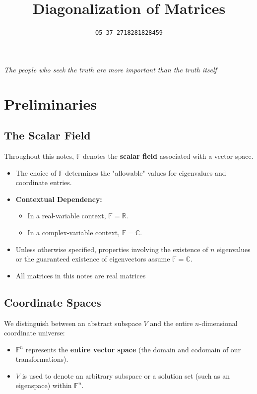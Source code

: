 \documentclass[11pt]{article}
\title{Diagonalization of Matrices}
\author{\texttt{O5-37-2718281828459}}
\begin{document}
    \maketitle

    \newpage
    \vspace*{\fill}
    \begin{center}
        \LARGE
        \selectfont\itshape The people who seek the truth are more important than the truth itself
    \end{center}
    \vspace*{\fill}

    \newpage
    \tableofcontents
    
    \newpage
    \setcounter{section}{-1}
    \section{Preliminaries}
    \subsection{The Scalar Field}
    Throughout this notes, $\mathbb{F}$ denotes the \textbf{scalar field} associated with a vector space. 
    \begin{itemize}
        \item The choice of $\mathbb{F}$ determines the "allowable" values for eigenvalues and coordinate entries.
        \item \textbf{Contextual Dependency:} 
        \begin{itemize}
            \item In a real-variable context, $\mathbb{F} = \mathbb{R}$.
            \item In a complex-variable context, $\mathbb{F} = \mathbb{C}$.
        \end{itemize}
        \item Unless otherwise specified, properties involving the existence of $n$ eigenvalues or the guaranteed existence of eigenvectors assume $\mathbb{F} = \mathbb{C}$.
        \item All matrices in this notes are real matrices
    \end{itemize}

    \subsection{Coordinate Spaces}
    We distinguish between an abstract subspace $V$ and the entire $n$-dimensional coordinate universe:
    \begin{itemize}
        \item $\mathbb{F}^n$ represents the \textbf{entire vector space} (the domain and codomain of our transformations).
        \item $V$ is used to denote an arbitrary subspace or a solution set (such as an eigenspace) within $\mathbb{F}^n$.
    \end{itemize}
\end{document}
